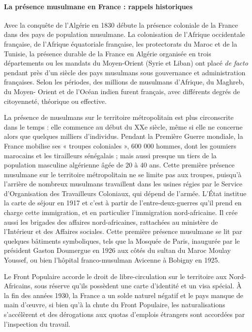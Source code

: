 \paragraph{La présence musulmane en France : rappels historiques}


Avec la conquête de l'Algérie en 1830 débute la présence coloniale de la
France dans des pays de population musulmane. La colonisation de
l'Afrique occidentale française, de l'Afrique équatoriale française, les
protectorats du Maroc et de la Tunisie, la présence durable de la France
en Algérie organisée en trois départements ou les mandats du
Moyen-Orient (Syrie et Liban) ont placé \emph{de facto} pendant près
d'un siècle des pays musulmans sous gouvernance et administration
françaises. Selon les périodes, des millions de musulmans d'Afrique, du
Maghreb, du Moyen- Orient et de l'Océan indien furent français, avec
différents degrés de citoyenneté, théorique ou effective.

La présence de musulmans sur le territoire métropolitain est plus
circonscrite dans le temps : elle commence au début du XXe siècle, même
si elle ne concerne alors que quelques milliers d'individus. Pendant la
Première Guerre mondiale, la France mobilise ses « troupes coloniales »,
600 000 hommes, dont les goumiers marocains et les tirailleurs
sénégalais ; mais aussi presque un tiers de la population masculine
algérienne âgée de 20 à 40 ans. Cette première présence musulmane sur le
territoire métropolitain ne se limite pas aux troupes, puisqu'à
l'arrière de nombreux musulmans travaillent dans les usines régies par
le Service d'Organisation des Travailleurs Coloniaux, qui dépend de
l'armée. L'État institue la carte de séjour en 1917 et c'est à partir de
l'entre-deux-guerres qu'il prend en charge cette immigration, et en
particulier l'immigration nord-africaine. Il crée aussi les brigades des
affaires nord-africaines, rattachées au ministère de l'Intérieur et des
Affaires sociales. Cette première présence musulmane se lit par quelques
bâtiments symboliques, tels que la Mosquée de Paris, inaugurée par le
président Gaston Doumergue en 1926 aux côtés du sultan du Maroc Moulay
Youssef, ou bien l'hôpital franco-musulman Avicenne à Bobigny en 1925.

Le Front Populaire accorde le droit de libre-circulation sur le
territoire aux Nord- Africains, sous réserve qu'ils possèdent une carte
d'identité et un visa spécial. À la fin des années 1930, la France a un
solde naturel négatif et le pays manque de main d'œuvre, si bien qu'à la
chute du Front Populaire, les naturalisations s'accélèrent et des
dérogations aux quotas d'emplois étrangers sont accordées par
l'inspection du travail.


